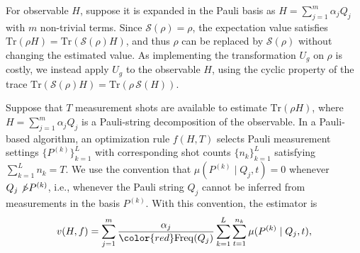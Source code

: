 \documentclass[prl,aps,twocolumn,notitlepage,superscriptaddress,showpacs,nofootinbib]{revtex4-2}
\newcommand{\red}[1]{{\color{red} #1}}
\begin{document}
For observable $H$, suppose it is expanded in the Pauli basis as $H=\sum_{j=1}^m \alpha_j Q_j$ with $m$ non-trivial terms.
Since $\mathcal{S}(\rho) = \rho$, the expectation value satisfies 
$\mathrm{Tr}(\rho H) = \mathrm{Tr}(\mathcal{S}(\rho) H)$, 
and thus $\rho$ can be replaced by $\mathcal{S}(\rho)$ without changing the estimated value. 
As implementing the transformation $U_g$ on $\rho$ is costly, 
we instead apply $U_g$ to the observable $H$, using the cyclic property of the trace $
    \mathrm{Tr}(\mathcal{S}(\rho) H) = \mathrm{Tr}(\rho\, \mathcal{S}(H))$.

Suppose that $T$ measurement shots are available to estimate $\mathrm{Tr}(\rho H)$, where $H=\sum_{j=1}^{m}\alpha_j Q_j$ is a Pauli-string decomposition of the observable. 
In a Pauli-based algorithm, an optimization rule $f(H,T)$ selects Pauli measurement settings $\{P^{(k)}\}_{k=1}^{L}$ with corresponding shot counts $\{n_k\}_{k=1}^{L}$ satisfying $\sum_{k=1}^{L}n_k=T$. 
\red{We use the convention that $\mu(P^{(k)}\mid Q_j,t)=0$ whenever $Q_j\not\triangleright P^{(k)}$, i.e., whenever the Pauli string $Q_j$ cannot be inferred from measurements in the basis $P^{(k)}$. 
With this convention, the estimator is}
\begin{equation}
    v(H,f)
    =
    \sum_{j=1}^{m}\frac{\alpha_j}{\red{\mathrm{Freq}(Q_j)}}
    \sum_{k=1}^{L}
    \sum_{t=1}^{n_k}
   \mu(P^{(k)}\mid Q_j,t) ,
    \label{eq:estimation_formula}
\end{equation}
\end{document}
